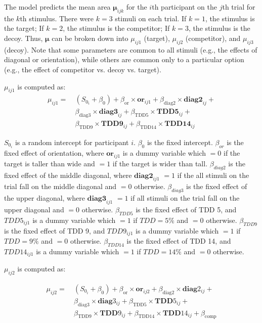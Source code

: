 The model predicts the mean area $\boldsymbol{\mu}_{ijk}$ for the $i$th participant on the $j$th trial for the $k$th stimulus. There were $k=3$ stimuli on each trial. If $k=1$, the stimulus is the target; If $k=2$, the stimulus is the competitor; If $k=3$, the stimulus is the decoy. Thus, $\boldsymbol{\mu}$ can be broken down into $\mu_{ij1}$ (target), $\mu_{ij2}$ (competitor), and $\mu_{ij3}$ (decoy). Note that some parameters are common to all stimuli (e.g., the effects of diagonal or orientation), while others are common only to a particular option (e.g., the effect of competitor vs. decoy vs. target). 

$\mu_{ij1}$ is computed as:
\begin{equation}
    \begin{aligned}
    \mu_{ij1} =\ & (S_{0_i} + \beta_{0}) 
    + \beta_{\mathrm{or}} \times \bm{or}_{ij1} 
    + \beta_{\mathrm{diag2}} \times \bm{diag2}_{ij} +\\
    & \beta_{\mathrm{diag3}} \times \bm{diag3}_{ij} 
    + \beta_{\mathrm{TDD5}} \times \bm{TDD5}_{ij} +\\
    & \beta_{\mathrm{TDD9}} \times \bm{TDD9}_{ij} 
    + \beta_{\mathrm{TDD14}} \times \bm{TDD14}_{ij}
    \end{aligned}
    \label{circle_mu_eqn1}
\end{equation}

$S_{0_i}$ is a random intercept for participant $i$. $\beta_{0}$ is the fixed intercept. $\beta_{or}$ is the fixed effect of orientation, where $\bm{or}_{ij1}$ is a dummy variable which $=0$ if the target is taller than wide and $=1$ if the target is wider than tall. $\beta_{diag2}$ is the fixed effect of the middle diagonal, where $\bm{diag2}_{ij1}$ $=1$ if the all stimuli on the trial fall on the middle diagonal and $=0$ otherwise. $\beta_{diag3}$ is the fixed effect of the upper diagonal, where $\bm{diag3}_{ij1}$ $=1$ if all stimuli on the trial fall on the upper diagonal and $=0$ otherwise. $\beta_{TDD5}$ is the fixed effect of TDD 5, and $TDD5_{ij1}$ is a dummy variable which $=1$ if $TDD=5\%$ and $=0$ otherwise. $\beta_{TDD9}$ is the fixed effect of TDD 9, and $TDD9_{ij1}$ is a dummy variable which $=1$ if $TDD=9\%$ and $=0$ otherwise. $\beta_{TDD14}$ is the fixed effect of TDD 14, and $TDD14_{ij1}$ is a dummy variable which $=1$ if $TDD=14\%$ and $=0$ otherwise. 

$\mu_{ij2}$ is computed as:

\begin{equation}
    \begin{aligned}
    \mu_{ij2} =\ & (S_{0_i} + \beta_{0}) 
    + \beta_{\mathrm{or}} \times \bm{or}_{ij2} 
    + \beta_{\mathrm{diag}2} \times \bm{diag}2_{ij} +\\
    & \beta_{\mathrm{diag}3} \times \bm{diag}3_{ij} 
    + \beta_{\mathrm{TDD}5} \times \bm{TDD}5_{ij} +\\
    & \beta_{\mathrm{TDD}9} \times \bm{TDD}9_{ij} 
    + \beta_{\mathrm{TDD}14} \times \bm{TDD}14_{ij} 
    + \beta_{\mathrm{comp}}
    \end{aligned}
    \label{circle_mu_eqn2}
\end{equation}


